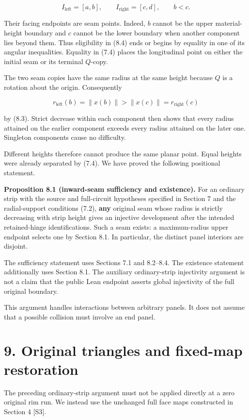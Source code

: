 \documentclass[
  11pt,
  letterpaper,
]{article}
\begin{document}
\[
I_{\mathrm{left}}=[a,b],\qquad I_{\mathrm{right}}=[c,d],\qquad b<c.
\]

Their facing endpoints are seam points. Indeed, \(b\) cannot be the
upper material-height boundary and \(c\) cannot be the lower boundary
when another component lies beyond them. Thus eligibility in (8.4) ends
or begins by equality in one of its angular inequalities. Equality in
(7.4) places the longitudinal point on either the initial seam or its
terminal \(Q\)-copy.

The two seam copies have the same radius at the same height because
\(Q\) is a rotation about the origin. Consequently

\[
r_{\mathrm{left}}(b)=\|x(b)\|>\|x(c)\|=r_{\mathrm{right}}(c)
\]

by (8.3). Strict decrease within each component then shows that every
radius attained on the earlier component exceeds every radius attained
on the later one. Singleton components cause no difficulty.

Different heights therefore cannot produce the same planar point. Equal
heights were already separated by (7.4). We have proved the following
positional statement.

\textbf{Proposition 8.1 (inward-seam sufficiency and existence).} For an
ordinary strip with the source and full-circuit hypotheses specified in
Section 7 and the radial-support conditions (7.2), \textbf{any} original
seam whose radius is strictly decreasing with strip height gives an
injective development after the intended retained-hinge identifications.
Such a seam exists: a maximum-radius upper endpoint selects one by
Section 8.1. In particular, the distinct panel interiors are disjoint.

The sufficiency statement uses Sections 7.1 and 8.2--8.4. The existence
statement additionally uses Section 8.1. The auxiliary ordinary-strip
injectivity argument is not a claim that the public Lean endpoint
asserts global injectivity of the full original boundary.

This argument handles interactions between arbitrary panels. It does not
assume that a possible collision must involve an end panel.

\section{9. Original triangles and fixed-map
restoration}\label{original-triangles-and-fixed-map-restoration}

The preceding ordinary-strip argument must not be applied directly at a
zero original rim run. We instead use the unchanged full face maps
constructed in Section 4 {[}S3{]}.
\end{document}
